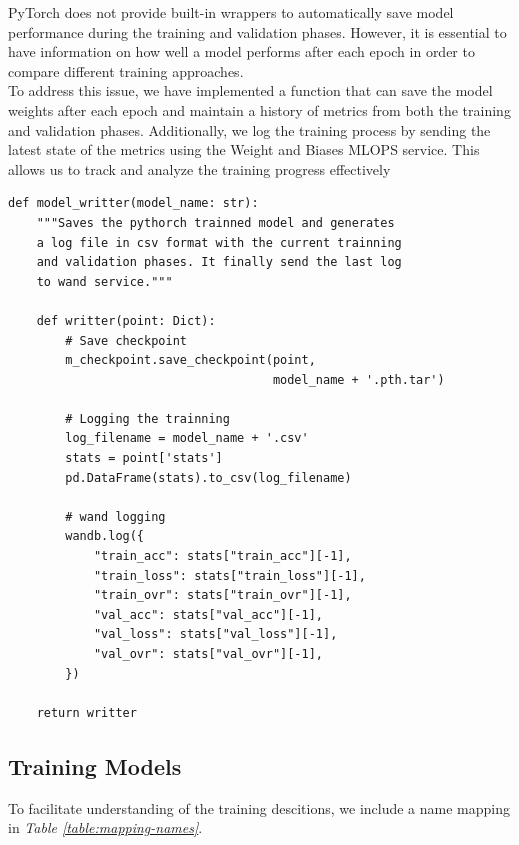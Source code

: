 PyTorch does not provide built-in wrappers to automatically save model
performance during the training and validation phases. However, it is essential
to have information on how well a model performs after each epoch in order to
compare different training approaches. \\

To address this issue, we have implemented a function that can save the model
weights after each epoch and maintain a history of metrics from both the
training and validation phases. Additionally, we log the training process by
sending the latest state of the metrics using the Weight and Biases MLOPS
service. This allows us to track and analyze the training progress effectively

\begin{Verbatim}[fontsize=\scriptsize]
def model_writter(model_name: str):
    """Saves the pythorch trainned model and generates
    a log file in csv format with the current trainning
    and validation phases. It finally send the last log
    to wand service."""

    def writter(point: Dict):
        # Save checkpoint
        m_checkpoint.save_checkpoint(point,
                                     model_name + '.pth.tar')

        # Logging the trainning
        log_filename = model_name + '.csv'
        stats = point['stats']
        pd.DataFrame(stats).to_csv(log_filename)

        # wand logging
        wandb.log({
            "train_acc": stats["train_acc"][-1],
            "train_loss": stats["train_loss"][-1],
            "train_ovr": stats["train_ovr"][-1],
            "val_acc": stats["val_acc"][-1],
            "val_loss": stats["val_loss"][-1],
            "val_ovr": stats["val_ovr"][-1],
        })

    return writter
\end{Verbatim}

\newpage


\subsection{Training Models}

To facilitate understanding of the training descitions, we include a name
mapping in \textit{Table \ref{table:mapping-names}}.

